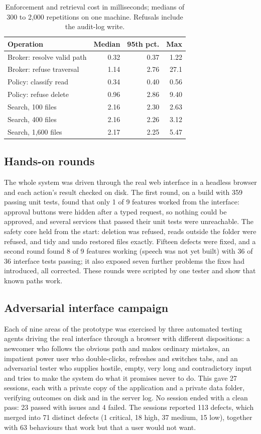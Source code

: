 \begin{table}[t]
  \centering
  \footnotesize
  \caption{Enforcement and retrieval cost in milliseconds; medians of 300 to 2,000 repetitions on one machine. Refusals include the audit-log write.}
  \label{tab:perf}
  \begin{tabular}{@{}lrrr@{}}
    \toprule
    Operation & Median & 95th pct. & Max \\
    \midrule
    Broker: resolve valid path & 0.32 & 0.37 & 1.22 \\
    Broker: refuse traversal & 1.14 & 2.76 & 27.1 \\
    Policy: classify read & 0.34 & 0.40 & 0.56 \\
    Policy: refuse delete & 0.96 & 2.86 & 9.40 \\
    Search, 100 files & 2.16 & 2.30 & 2.63 \\
    Search, 400 files & 2.16 & 2.26 & 3.12 \\
    Search, 1,600 files & 2.17 & 2.25 & 5.47 \\
    \bottomrule
  \end{tabular}
\end{table}

\subsection{Hands-on rounds}
The whole system was driven through the real web interface in a headless browser and each action's result checked on disk. The first round, on a build with 359 passing unit tests, found that only 1 of 9 features worked from the interface: approval buttons were hidden after a typed request, so nothing could be approved, and several services that passed their unit tests were unreachable. The safety core held from the start: deletion was refused, reads outside the folder were refused, and tidy and undo restored files exactly. Fifteen defects were fixed, and a second round found 8 of 9 features working (speech was not yet built) with 36 of 36 interface tests passing; it also exposed seven further problems the fixes had introduced, all corrected. These rounds were scripted by one tester and show that known paths work.

\subsection{Adversarial interface campaign}
\label{sec:campaign}
Each of nine areas of the prototype was exercised by three automated testing agents driving the real interface through a browser with different dispositions: a newcomer who follows the obvious path and makes ordinary mistakes, an impatient power user who double-clicks, refreshes and switches tabs, and an adversarial tester who supplies hostile, empty, very long and contradictory input and tries to make the system do what it promises never to do. This gave 27 sessions, each with a private copy of the application and a private data folder, verifying outcomes on disk and in the server log. No session ended with a clean pass: 23 passed with issues and 4 failed. The sessions reported 113 defects, which merged into 71 distinct defects (1 critical, 18 high, 37 medium, 15 low), together with 63 behaviours that work but that a user would not want.

